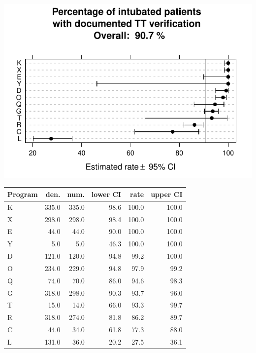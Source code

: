 \documentclass[twoside]{article}\usepackage[]{graphicx}\usepackage[]{color}
\makeatletter
\def\maxwidth{ %
  \ifdim\Gin@nat@width>\linewidth
    \linewidth
  \else
    \Gin@nat@width
  \fi
}
\newenvironment{knitrout}{}{} %
\makeatother
\begin{document}
\begin{center}
\begin{knitrout}
\color{fgcolor}
\includegraphics[width=\maxwidth]{figure/r_tracheal_tube_placement} 

\end{knitrout}

\end{center}

\begin{table}[ht]
\centering
\begin{tabular}{lrrrrr}
  \hline
Program & den. & num. & lower CI & rate & upper CI \\ 
  \hline
K & 335.0 & 335.0 & 98.6 & 100.0 & 100.0 \\ 
  X & 298.0 & 298.0 & 98.4 & 100.0 & 100.0 \\ 
  E & 44.0 & 44.0 & 90.0 & 100.0 & 100.0 \\ 
  Y & 5.0 & 5.0 & 46.3 & 100.0 & 100.0 \\ 
  D & 121.0 & 120.0 & 94.8 & 99.2 & 100.0 \\ 
  O & 234.0 & 229.0 & 94.8 & 97.9 & 99.2 \\ 
  Q & 74.0 & 70.0 & 86.0 & 94.6 & 98.3 \\ 
  G & 318.0 & 298.0 & 90.3 & 93.7 & 96.0 \\ 
  T & 15.0 & 14.0 & 66.0 & 93.3 & 99.7 \\ 
  R & 318.0 & 274.0 & 81.8 & 86.2 & 89.7 \\ 
  C & 44.0 & 34.0 & 61.8 & 77.3 & 88.0 \\ 
  L & 131.0 & 36.0 & 20.2 & 27.5 & 36.1 \\ 
   \hline
\end{tabular}
\end{table}
\end{document}
